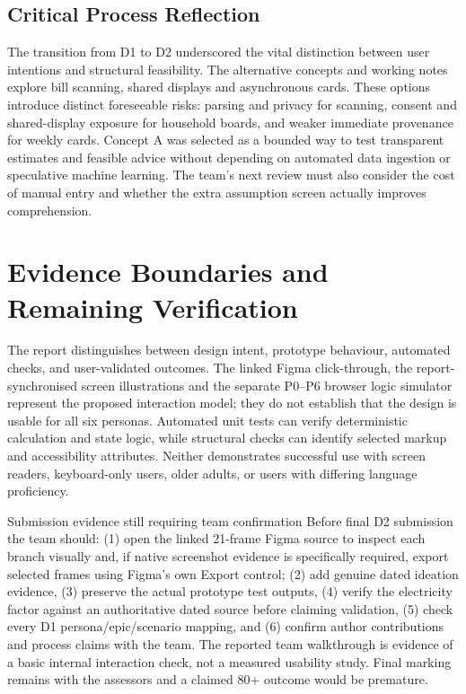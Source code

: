 \documentclass[12pt,a4paper]{article}
\begin{document}
\subsection{Critical Process Reflection}
The transition from D1 to D2 underscored the vital distinction between user intentions and structural feasibility. The alternative concepts and working notes explore bill scanning, shared displays and asynchronous cards. These options introduce distinct foreseeable risks: parsing and privacy for scanning, consent and shared-display exposure for household boards, and weaker immediate provenance for weekly cards. Concept A was selected as a bounded way to test transparent estimates and feasible advice without depending on automated data ingestion or speculative machine learning. The team's next review must also consider the cost of manual entry and whether the extra assumption screen actually improves comprehension.

\section{Evidence Boundaries and Remaining Verification}

The report distinguishes between design intent, prototype behaviour, automated checks, and user-validated outcomes. The linked Figma click-through, the report-synchronised screen illustrations and the separate P0--P6 browser logic simulator represent the proposed interaction model; they do not establish that the design is usable for all six personas. Automated unit tests can verify deterministic calculation and state logic, while structural checks can identify selected markup and accessibility attributes. Neither demonstrates successful use with screen readers, keyboard-only users, older adults, or users with differing language proficiency.

\begin{cautionbox}{Submission evidence still requiring team confirmation}
Before final D2 submission the team should: (1) open the linked 21-frame Figma source to inspect each branch visually and, if native screenshot evidence is specifically required, export selected frames using Figma's own Export control; (2) add genuine dated ideation evidence, (3) preserve the actual prototype test outputs, (4) verify the electricity factor against an authoritative dated source before claiming validation, (5) check every D1 persona/epic/scenario mapping, and (6) confirm author contributions and process claims with the team. The reported team walkthrough is evidence of a basic internal interaction check, not a measured usability study. Final marking remains with the assessors and a claimed 80+ outcome would be premature.
\end{cautionbox}
\end{document}
